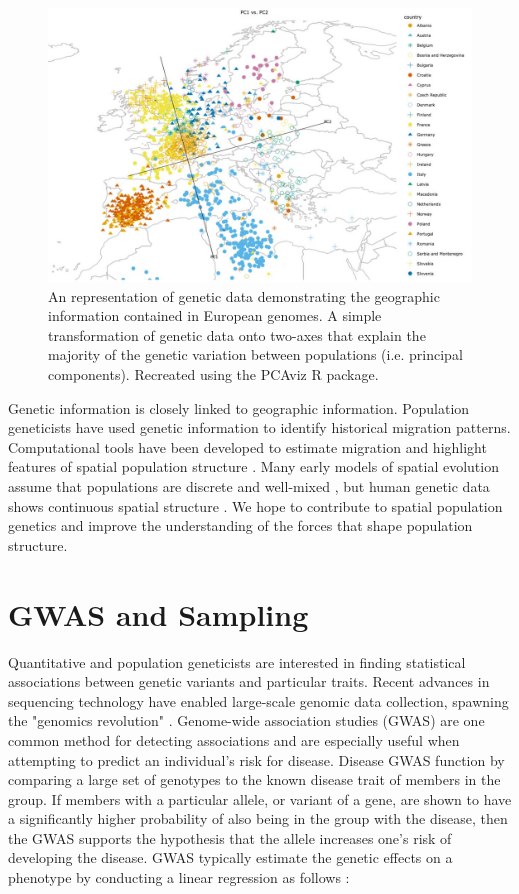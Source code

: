 \begin{figure}[H]
    \centering
    \includegraphics[scale = 0.45]{img/novembre_pca.JPG}
    \caption{An representation of genetic data demonstrating the geographic information contained in European genomes. A simple transformation of genetic data onto two-axes that explain the majority of the genetic variation between populations (i.e. principal components). Recreated using the PCAviz R package. \cite{pcaviz}}
    \label{fig:novembre_pca}
\end{figure}

Genetic information is closely linked to geographic information. Population geneticists have used genetic information to identify historical migration patterns. Computational tools have been developed to estimate migration and highlight features of spatial population structure \cite{petkova_visualizing_2016}. Many early models of spatial evolution assume that populations are discrete and well-mixed \cite{sigwart_coalescent_2009} \cite{kingman_coalescent_1982}, but human genetic data shows continuous spatial structure \cite{novembre_interpreting_2008}. We hope to contribute to spatial population genetics and improve the understanding of the forces that shape population structure.


\section{GWAS and Sampling}
Quantitative and population geneticists are interested in finding statistical associations between genetic variants and particular traits. Recent advances in sequencing technology have enabled large-scale genomic data collection, spawning the "genomics revolution" \cite{lander_initial_2001}. Genome-wide association studies (GWAS) are one common method for detecting associations and are especially useful when attempting to predict an individual’s risk for disease. Disease GWAS function by comparing a large set of genotypes to the known disease trait of members in the group. If members with a particular allele, or variant of a gene, are shown to have a significantly higher probability of also being in the group with the disease, then the GWAS supports the hypothesis that the allele increases one’s risk of developing the disease. GWAS typically estimate the genetic effects on a phenotype by conducting a linear regression as follows \cite{dudbridge_power_2013} \cite{xie_efficiency_1998}:

